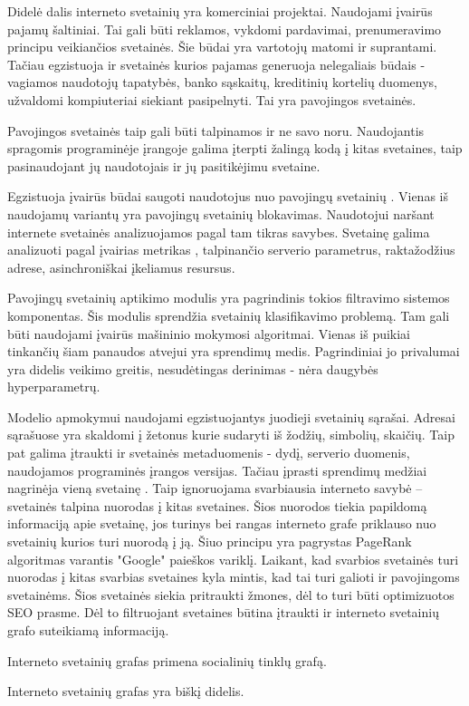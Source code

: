 

Didelė dalis interneto svetainių yra komerciniai projektai. Naudojami įvairūs pajamų šaltiniai.
Tai gali būti reklamos, vykdomi pardavimai, prenumeravimo principu veikiančios svetainės.
Šie būdai yra vartotojų matomi ir suprantami. Tačiau egzistuoja ir svetainės kurios pajamas
generuoja nelegaliais būdais - vagiamos naudotojų tapatybės, banko sąskaitų, kreditinių kortelių
duomenys, užvaldomi kompiuteriai siekiant pasipelnyti. Tai yra pavojingos svetainės.

Pavojingos svetainės taip gali būti talpinamos ir ne savo noru.
Naudojantis spragomis programinėje įrangoje galima įterpti žalingą kodą į kitas svetaines,
taip pasinaudojant jų naudotojais ir jų pasitikėjimu svetaine.

Egzistuoja įvairūs būdai saugoti naudotojus nuo pavojingų svetainių \cite{trees}.
Vienas iš naudojamų variantų yra pavojingų svetainių blokavimas.
Naudotojui naršant internete svetainės analizuojamos pagal tam tikras savybes.
Svetainę galima analizuoti pagal įvairias metrikas \cite{tangled},
talpinančio serverio parametrus, raktažodžius adrese, asinchroniškai įkeliamus resursus.

Pavojingų svetainių aptikimo modulis yra pagrindinis tokios filtravimo sistemos komponentas.
Šis modulis sprendžia svetainių klasifikavimo problemą. Tam gali būti naudojami įvairūs mašininio mokymosi algoritmai.
Vienas iš puikiai tinkančių šiam panaudos atvejui \cite{trees} yra sprendimų medis.
Pagrindiniai jo privalumai yra didelis veikimo greitis, nesudėtingas derinimas - nėra daugybės hyperparametrų.

Modelio apmokymui naudojami egzistuojantys juodieji svetainių sąrašai.
Adresai sąrašuose yra skaldomi į žetonus kurie sudaryti iš žodžių, simbolių, skaičių.
Taip pat galima įtraukti ir svetainės metaduomenis - dydį, serverio duomenis, naudojamos programinės įrangos versijas.
Tačiau įprasti sprendimų medžiai nagrinėja vieną svetainę \cite{trees}.
Taip ignoruojama svarbiausia interneto savybė -- svetainės talpina nuorodas į kitas svetaines.
Šios nuorodos tiekia papildomą informaciją apie svetainę,
jos turinys bei rangas interneto grafe priklauso nuo svetainių kurios turi nuorodą į ją.
Šiuo principu yra pagrystas PageRank algoritmas \cite{pagerank} varantis "Google" paieškos variklį.
Laikant, kad svarbios svetainės turi nuorodas į kitas svarbias svetaines kyla mintis,
kad tai turi galioti ir pavojingoms svetainėms.
Šios svetainės siekia pritraukti žmones, dėl to turi būti optimizuotos SEO prasme.
Dėl to filtruojant svetaines būtina įtraukti ir interneto svetainių grafo suteikiamą informaciją.

Interneto svetainių grafas primena socialinių tinklų grafą.

Interneto svetainių grafas yra biškį didelis.


\newpage